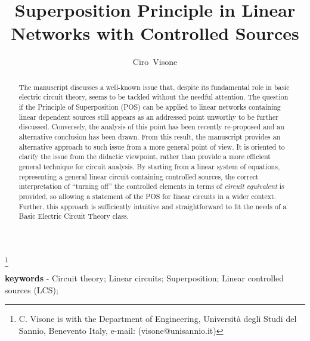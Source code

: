 \documentclass[10pt]{amsart}
\begin{document}
\title{Superposition Principle in Linear Networks with Controlled Sources}
\author{Ciro~Visone}
\thanks{C. Visone is with the Department
of Engineering, Universit\`a degli Studi del Sannio, Benevento Italy, e-mail: (visone@unisannio.it)}

\begin{abstract}
The manuscript discusses a well-known issue that, despite its fundamental role in basic electric circuit theory, seems to be tackled without the needful attention. The question if the Principle of Superposition (POS) can be applied to linear networks containing linear dependent sources still appears as an addressed point unworthy to be further discussed. Conversely, the analysis of this point has been recently re-proposed \cite{M-L-94, Damper_11} and an alternative conclusion has been drawn. From this result, the manuscript provides an alternative approach to such issue from a more general point of view. It is oriented to clarify the issue from the didactic viewpoint, rather than provide a more efficient general technique for circuit analysis.
By starting from a linear system of equations, representing a general linear circuit containing controlled sources, the correct interpretation of ``turning off'' the controlled elements in terms of \emph{circuit equivalent} is provided, so allowing a statement of the POS for linear circuits in a wider context. Further, this approach is sufficiently intuitive and straightforward to fit the needs of a Basic Electric Circuit Theory class.
\end{abstract}

\maketitle

\textbf{keywords} - Circuit theory; Linear circuits; Superposition; Linear controlled sources (LCS);
\end{document}
